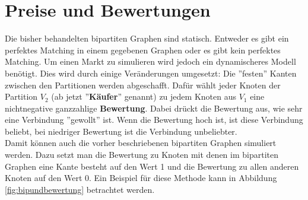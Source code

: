 \documentclass[a4paper]{scrreprt}
\theoremstyle{plain} %
\theoremstyle{definition} %
\begin{document}

\chapter{Preise und Bewertungen}
Die bisher behandelten bipartiten Graphen sind statisch. Entweder es gibt ein perfektes
Matching in einem gegebenen Graphen oder es gibt kein perfektes Matching. Um einen Markt zu simulieren wird jedoch
ein dynamischeres Modell benötigt. Dies wird durch einige Veränderungen umgesetzt: Die ''festen'' Kanten zwischen den
Partitionen werden abgeschafft. Dafür wählt jeder Knoten der Partition $V_2$ (ab jetzt ''\textbf{Käufer}'' genannt)
zu jedem Knoten aus $V_1$ eine nichtnegative ganzzahlige \textbf{Bewertung}. Dabei drückt die Bewertung aus, wie sehr eine Verbindung ''gewollt'' ist.
Wenn die Bewertung hoch ist, ist diese Verbindung beliebt, bei niedriger Bewertung ist die Verbindung unbeliebter.
\\
Damit können auch die vorher beschriebenen bipartiten Graphen simuliert werden. Dazu setzt man die
Bewertung zu Knoten mit denen im bipartiten Graphen eine Kante besteht auf den Wert 1 und die Bewertung
zu allen anderen Knoten auf den Wert 0. Ein Beispiel für diese Methode kann in Abbildung \ref{fig:bipundbewertung} betrachtet werden.
\end{document}
